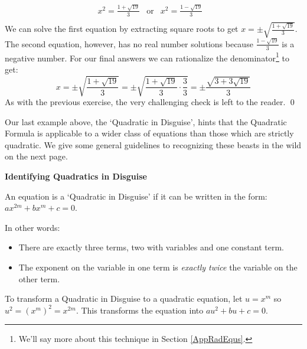 \documentclass{ximera}
\begin{document}
\begin{example}
\begin{explanation}
\begin{enumerate}
\[\begin{array}{rclr}
x^2  =\frac{1 + \sqrt{19}}{3} & \text{or} & x^2  =\frac{1 - \sqrt{19}}{3} & \\

\end{array}\] We can solve the first equation by extracting square roots to get  $x = \pm \sqrt{\frac{1 + \sqrt{19}}{3}}$.  The second equation, however, has no real number solutions because $\frac{1 - \sqrt{19}}{3}$ is a negative number.  For our final answers we can rationalize the denominator\footnote{We'll say more about this technique in Section \ref{AppRadEqus}.} to get: \[ x = \pm \sqrt{\frac{1 + \sqrt{19}}{3}} = \pm \sqrt{\frac{1 + \sqrt{19}}{3} \cdot \frac{3}{3}} = \pm \frac{\sqrt{3 + 3\sqrt{19}}}{3} \] As with the previous exercise, the very challenging check is left to the reader. \qed

\end{enumerate}
\end{explanation}
\end{example}

Our last example above, the `Quadratic in Disguise', hints that the Quadratic Formula is applicable to a wider class of equations than those which are strictly quadratic.  We give some general guidelines to recognizing these beasts in the wild on the next page.

\label{QuadinDisguise}

\centerline{\textbf{Identifying Quadratics in Disguise}}

An equation is a `Quadratic in Disguise' if it can be written in the form:  $ax^{2m} + bx^{m} + c = 0$.  

In other words:

\begin{itemize}

\item There are exactly three terms, two with variables and one constant term.

\item  The exponent on the variable in one term is \textit{exactly twice} the variable on the other term.

\end{itemize}

To transform a Quadratic in Disguise to a quadratic equation, let $u = x^m$ so $u^2 = (x^m)^2 = x^{2m}$. This transforms the equation into $au^2 + bu + c = 0$.


 
\end{document}
